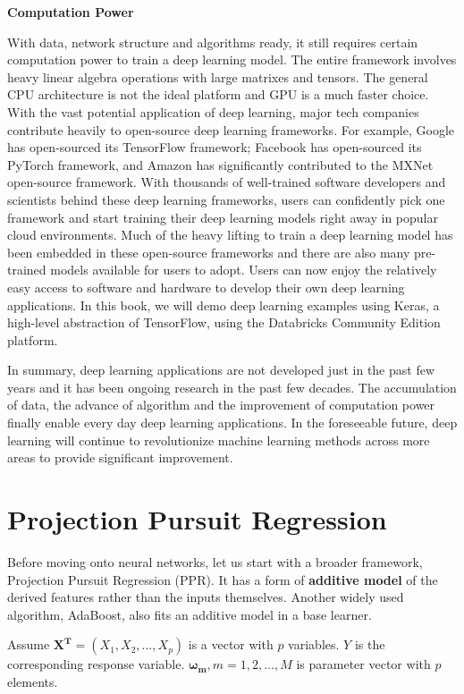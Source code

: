 \documentclass[12pt,]{krantz}
\begin{document}
\textbf{Computation Power}

With data, network structure and algorithms ready, it still requires certain computation power to train a deep learning model. The entire framework involves heavy linear algebra operations with large matrixes and tensors. The general CPU architecture is not the ideal platform and GPU is a much faster choice. With the vast potential application of deep learning, major tech companies contribute heavily to open-source deep learning frameworks. For example, Google has open-sourced its TensorFlow framework; Facebook has open-sourced its PyTorch framework, and Amazon has significantly contributed to the MXNet open-source framework. With thousands of well-trained software developers and scientists behind these deep learning frameworks, users can confidently pick one framework and start training their deep learning models right away in popular cloud environments. Much of the heavy lifting to train a deep learning model has been embedded in these open-source frameworks and there are also many pre-trained models available for users to adopt. Users can now enjoy the relatively easy access to software and hardware to develop their own deep learning applications. In this book, we will demo deep learning examples using Keras, a high-level abstraction of TensorFlow, using the Databricks Community Edition platform.

In summary, deep learning applications are not developed just in the past few years and it has been ongoing research in the past few decades. The accumulation of data, the advance of algorithm and the improvement of computation power finally enable every day deep learning applications. In the foreseeable future, deep learning will continue to revolutionize machine learning methods across more areas to provide significant improvement.

\hypertarget{projection-pursuit-regression}{%
\section{Projection Pursuit Regression}\label{projection-pursuit-regression}}

Before moving onto neural networks, let us start with a broader framework, Projection Pursuit Regression (PPR). It has a form of \textbf{additive model} of the derived features rather than the inputs themselves. Another widely used algorithm, AdaBoost, also fits an additive model in a base learner.

Assume \(\mathbf{X^{T}}=(X_1,X_2,\dots,X_p)\) is a vector with \(p\) variables. \(Y\) is the corresponding response variable. \(\mathbf{\omega_{m}},m=1,2,\dots,M\) is parameter vector with \(p\) elements.
\end{document}
